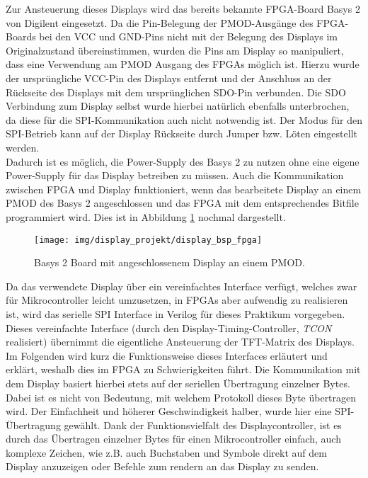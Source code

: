 Zur Ansteuerung dieses Displays wird das bereits bekannte FPGA-Board Basys 2 von Digilent\cite{basys2} eingesetzt. Da die Pin-Belegung der PMOD-Ausgänge des FPGA-Boards bei den VCC und GND-Pins nicht mit der Belegung des Displays im Originalzustand übereinstimmen, wurden die Pins am Display so manipuliert, dass eine Verwendung am PMOD Ausgang des FPGAs möglich ist. Hierzu wurde der ursprüngliche VCC-Pin des Displays entfernt und der Anschluss an der Rückseite des Displays mit dem ursprünglichen SDO-Pin verbunden. Die SDO Verbindung zum Display selbst wurde hierbei natürlich ebenfalls unterbrochen, da diese für die SPI-Kommunikation auch nicht notwendig ist. Der Modus für den SPI-Betrieb kann auf der Display Rückseite durch Jumper bzw. Löten eingestellt werden.\\
Dadurch ist es möglich, die Power-Supply des Basys 2 zu nutzen ohne eine eigene Power-Supply für das Display betreiben zu müssen. Auch die Kommunikation zwischen FPGA und Display funktioniert, wenn das bearbeitete Display an einem PMOD des Basys 2 angeschlossen und das FPGA mit dem entsprechendes Bitfile programmiert wird. Dies ist in Abbildung \ref{fig:display_bespiel_angeschlossen} nochmal dargestellt. 
\begin{figure}[H]
\centering
\texttt{[image: img/display\_projekt/display\_bsp\_fpga]}
\caption{Basys 2 Board mit angeschlossenem Display an einem PMOD.}
\label{fig:display_bespiel_angeschlossen}
\end{figure}
Da das verwendete Display über ein vereinfachtes Interface verfügt, welches zwar für Mikrocontroller leicht umzusetzen, in FPGAs aber aufwendig zu realisieren ist, wird das serielle SPI Interface in Verilog für dieses Praktikum vorgegeben. Dieses vereinfachte Interface (durch den Display-Timing-Controller, \emph{TCON} realisiert) übernimmt die eigentliche Ansteuerung der TFT-Matrix des Displays.\\
Im Folgenden wird kurz die Funktionsweise dieses Interfaces erläutert und erklärt, weshalb dies im FPGA zu Schwierigkeiten führt. 
Die Kommunikation mit dem Display basiert hierbei stets auf der seriellen Übertragung einzelner Bytes. Dabei ist es nicht von Bedeutung, mit welchem Protokoll dieses Byte übertragen wird. Der Einfachheit und höherer Geschwindigkeit halber, wurde hier eine SPI-Übertragung gewählt.
Dank der Funktionsvielfalt des Displaycontroller, ist es durch das Übertragen einzelner Bytes für einen Mikrocontroller einfach, auch komplexe Zeichen, wie z.B. auch Buchstaben und Symbole direkt auf dem Display anzuzeigen oder Befehle zum rendern an das Display zu senden.\\

